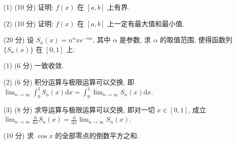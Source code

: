 (1) (10 分) 证明: $f(x)$ 在 $[a, b]$ 上有界.\par
(2) (10 分) 证明: $f(x)$ 在 $[a, b]$ 上一定有最大值和最小值.\par
(20 分) 设 $S_{n}(x) = n^{\alpha}xe^{-nx}$, 其中 $\alpha$ 是参数, 求 $\alpha$ 的取值范围, 使得函数列 $\{S_{n}(x)\}$ 在 $[0,1]$ 上:\par
(1) (6 分) 一致收敛.\par
(2) (6 分) 积分运算与极限运算可以交换, 即 $\lim_{n\to \infty}\int_0^1 S_n(x)\mathrm{d}x = \int_0^1\lim_{n\to \infty}S_n(x)\mathrm{d}x.$\par
(3) (8 分) 求导运算与极限运算可以交换, 即对一切 $x \in [0,1]$, 成立 $\lim_{n \to \infty} \frac{\mathrm{d}}{\mathrm{d}x} S_n(x) = \frac{\mathrm{d}}{\mathrm{d}x} \lim_{n \to \infty} S_n(x)$.\par
(10 分) 求 $\cos x$ 的全部零点的倒数平方之和.\par
